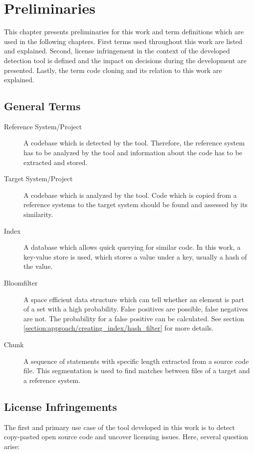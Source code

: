 
\chapter{Preliminaries}\label{chapter:preliminaries}
This chapter presents preliminaries for this work and term definitions which are used in the following chapters.
First terms used throughout this work are listed and explained.
Second, license infringement in the context of the developed detection tool is defined and the impact on decisions during the development are presented.
Lastly, the term code cloning and its relation to this work are explained.

\section{General Terms}\label{section:preliminaries/terms}
\begin{description}
	\item[Reference System/Project]
		A codebase which is detected by the tool. 
		Therefore, the reference system has to be analyzed by the tool and information about the code has to be extracted and stored.
	\item[Target System/Project]
		A codebase which is analyzed by the tool. 
		Code which is copied from a reference systems to the target system should be found and assessed by its similarity.
	\item[Index] 
		A database which allows quick querying for similar code.
		In this work, a key-value store is used, which stores a value under a key, usually a hash of the value.
	\item [Bloomfilter]
		A space efficient data structure which can tell whether an element is part of a set with a high probability. 
		False positives are possible, false negatives are not.
		The probability for a false positive can be calculated. See section \ref{section:approach/creating_index/hash_filter} for more details.
	\item [Chunk]
		A sequence of statements with specific length extracted from a source code file.
		This segmentation is used to find matches between files of a target and a reference system.
\end{description}

\section{License Infringements}\label{section:preliminaries/infringement}
The first and primary use case of the tool developed in this work is to detect copy-pasted open source code and uncover licensing issues.
Here, several question arise:

